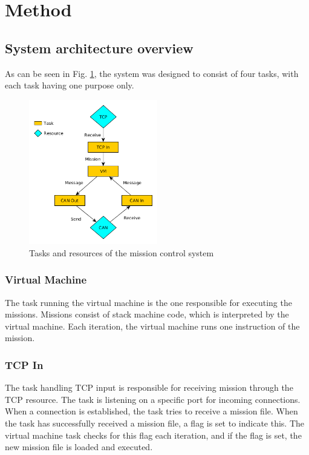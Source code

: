 \section{Method}\label{sec:method}
\subsection{System architecture overview}
As can be seen in Fig. \ref{fig:data_flow_figure}, the system was designed to consist of four tasks, with each task having one purpose only.

\pageref{fig:data_flow_figure}
\begin{figure}[h]
    \includegraphics[width=0.5\textwidth]{./figure/figureTasksAndResources.png}
    \caption{Tasks and resources of the mission control system}
    \label{fig:data_flow_figure}
\end{figure}

\subsubsection{Virtual Machine}
The task running the virtual machine is the one responsible for executing the missions. Missions consist of stack machine code, which is interpreted by the virtual machine. Each iteration, the virtual machine runs one instruction of the mission.

\subsubsection{TCP In}
The task handling TCP input is responsible for receiving mission through the TCP resource. The task is listening on a specific port for incoming connections. When a connection is established, the task tries to receive a mission file. When the task has successfully received a mission file, a flag is set to indicate this. The virtual machine task checks for this flag each iteration, and if the flag is set, the new mission file is loaded and executed.


